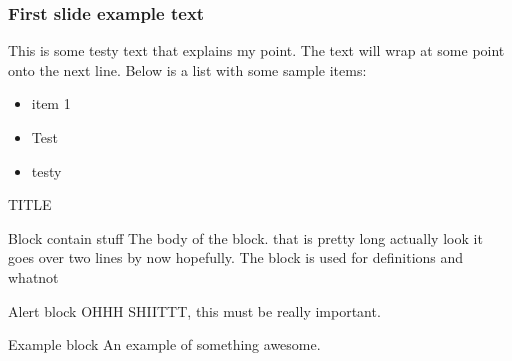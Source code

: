 \documentclass[aspectratio=169]{beamer}
\begin{document}
\begin{frame}
  \frametitle{First slide example text}
  This is some testy text that explains my point. The text will wrap at some point onto the next line.
  Below is a list with some sample items:
  \begin{itemize}
    \item{item 1}
    \item{Test}
    \item{testy}
  \end{itemize}
\end{frame}

\begin{frame}{TITLE}
	\begin{block}{Block contain stuff}
		The body of the block. that is pretty long actually look it goes over two lines by now hopefully. The block is used for definitions and whatnot
	\end{block}
	\begin{alertblock}{Alert block}
		OHHH SHIITTT, this must be really important.
	\end{alertblock}
	\begin{exampleblock}{Example block}
		An example of something awesome.
	\end{exampleblock}
\end{frame}
\end{document}

